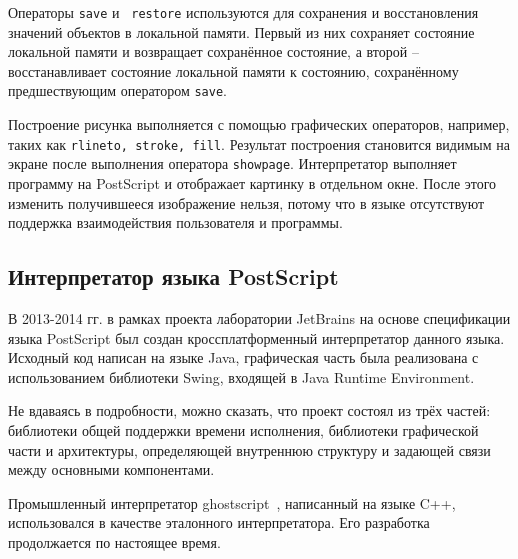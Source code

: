 Операторы \texttt{save} и \texttt{ restore} используются для сохранения и восстановления значений объектов в локальной памяти. Первый из них сохраняет состояние локальной памяти и возвращает сохранённое состояние, а второй -- восстанавливает  состояние локальной памяти к состоянию, сохранённому предшествующим оператором \texttt{save}.


Построение рисунка выполняется с помощью графических операторов, например, таких как \texttt{rlineto, stroke, fill}. Результат построения становится видимым на экране после выполнения оператора \texttt{showpage}. Интерпретатор выполняет программу на PostScript и отображает картинку в отдельном окне. После этого изменить получившееся изображение нельзя, потому что в языке отсутствуют поддержка взаимодействия пользователя и программы.





\subsection{Интерпретатор языка PostScript}

В 2013-2014 гг. в рамках проекта лаборатории JetBrains на основе спецификации языка PostScript был создан кроссплатформенный интерпретатор данного языка. Исходный код написан на языке Java, графическая часть была реализована с использованием библиотеки Swing, входящей в Java Runtime Environment.

Не вдаваясь в подробности, можно сказать, что проект состоял из трёх частей: библиотеки общей поддержки времени исполнения, библиотеки графической части и архитектуры, определяющей внутреннюю структуру и задающей связи между основными компонентами. 

Промышленный интерпретатор ghostscript~\cite{wiki:ghostscript}, написанный на языке C++, использовался в качестве эталонного интерпретатора.  Его разработка продолжается по настоящее время.


